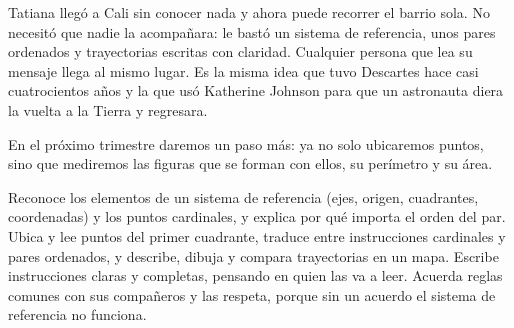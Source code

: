 \documentclass[11pt]{article}
\begin{document}

Tatiana llegó a Cali sin conocer nada y ahora puede recorrer el barrio sola. No necesitó que
nadie la acompañara: le bastó un sistema de referencia, unos pares ordenados y trayectorias
escritas con claridad. Cualquier persona que lea su mensaje llega al mismo lugar. Es la misma
idea que tuvo Descartes hace casi cuatrocientos años y la que usó Katherine Johnson para que un
astronauta diera la vuelta a la Tierra y regresara.

En el próximo trimestre daremos un paso más: ya no solo ubicaremos puntos, sino que mediremos
las figuras que se forman con ellos, su perímetro y su área.

\matrizevaluacion
  {Reconoce los elementos de un sistema de referencia (ejes, origen, cuadrantes, coordenadas) y
   los puntos cardinales, y explica por qué importa el orden del par.}
  {Ubica y lee puntos del primer cuadrante, traduce entre instrucciones cardinales y pares
   ordenados, y describe, dibuja y compara trayectorias en un mapa.}
  {Escribe instrucciones claras y completas, pensando en quien las va a leer.}
  {Acuerda reglas comunes con sus compañeros y las respeta, porque sin un acuerdo el sistema de
   referencia no funciona.}

\autoevaluacion

\seguimientodocente
\end{document}
